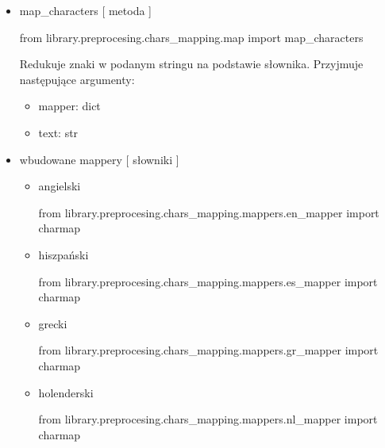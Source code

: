\myspace
{}
\myspace

\begin{itemize}

\item{map\_characters [ metoda ] }
\begin{import}
from library.preprocesing.chars_mapping.map import map_characters
\end{import}

Redukuje znaki w podanym stringu na podstawie słownika. 
Przyjmuje następujące argumenty:
\begin{itemize}
	\item mapper: dict
	\item text: str
\end{itemize}


\item{wbudowane mappery [ słowniki ] }

\begin{itemize} 

\item angielski
\begin{import}
from library.preprocesing.chars_mapping.mappers.en_mapper import charmap
\end{import}


\item hiszpański
\begin{import}
from library.preprocesing.chars_mapping.mappers.es_mapper import charmap
\end{import}


\item grecki
\begin{import}
from library.preprocesing.chars_mapping.mappers.gr_mapper import charmap
\end{import}


\item holenderski
\begin{import}
from library.preprocesing.chars_mapping.mappers.nl_mapper import charmap
\end{import}

\end{itemize}

\end{itemize}

\newpage
